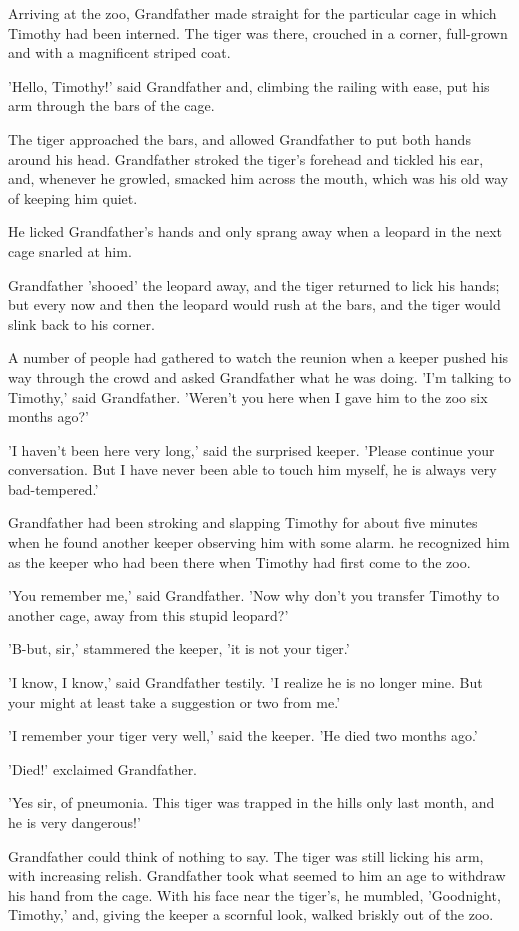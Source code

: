 \par
Arriving at the zoo, Grandfather made straight for the particular cage in which Timothy had been interned. The tiger was there, crouched in a corner, full-grown and with a magnificent striped coat.
\par
'Hello, Timothy!' said Grandfather and, climbing the railing with ease, put his arm through the bars of the cage.
\par
The tiger approached the bars, and allowed Grandfather to put both hands around his head. Grandfather stroked the tiger's forehead and tickled his ear, and, whenever he growled, smacked him across the mouth, which was his old way of keeping him quiet.
\par
He licked Grandfather's hands and only sprang away when a leopard in the next cage snarled at him.
\par
Grandfather 'shooed' the leopard away, and the tiger returned to lick his hands; but every now and then the leopard would rush at the bars, and the tiger would slink back to his corner.
\par
A number of people had gathered to watch the reunion when a keeper pushed his way through the crowd and asked Grandfather what he was doing. 'I'm talking to Timothy,' said Grandfather. 'Weren't you here when I gave him to the zoo six months ago?'
\par
'I haven't been here very long,' said the surprised keeper. 'Please continue your conversation. But I have never been able to touch him myself, he is always very bad-tempered.'
\par
Grandfather had been stroking and slapping Timothy for about five minutes when he found another keeper observing him with some alarm. he recognized him as the keeper who had been there when Timothy had first come to the zoo.
\par
'You remember me,' said Grandfather. 'Now why don't you transfer Timothy to another cage, away from this stupid leopard?'
\par
'B-but, sir,' stammered the keeper, 'it is not your tiger.'
\par
'I know, I know,' said Grandfather testily. 'I realize he is no longer mine. But your might at least take a suggestion or two from me.'
\par
'I remember your tiger very well,' said the keeper. 'He died two months ago.'
\par
'Died!' exclaimed Grandfather.
\par
'Yes sir, of pneumonia. This tiger was trapped in the hills only last month, and he is very dangerous!'
\par
Grandfather could think of nothing to say. The tiger was still licking his arm, with increasing relish. Grandfather took what seemed to him an age to withdraw his hand from the cage. With his face near the tiger's, he mumbled, 'Goodnight, Timothy,' and, giving the keeper a scornful look, walked briskly out of the zoo.